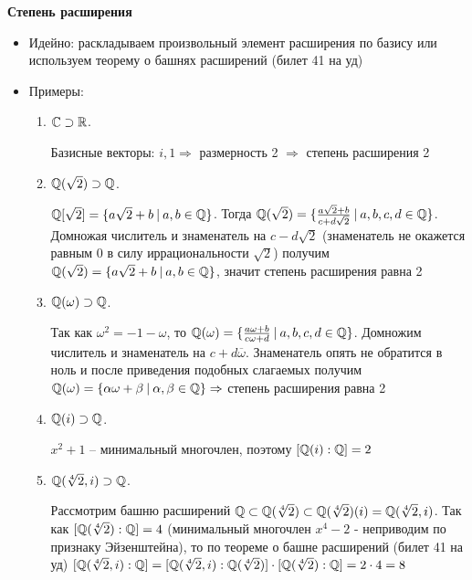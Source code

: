\par \textbf{Степень расширения}
\begin{itemize}
    \item Идейно: раскладываем произвольный элемент расширения по базису или используем теорему о башнях расширений (билет 41 на уд)
    \item Примеры:
\begin{enumerate}
    \item $\mathbb{C} \supset \mathbb{R}$. 
    \par Базисные векторы: $i, 1 \Rightarrow$ размерность 2 $\Rightarrow$ степень расширения 2
    \item $\mathbb{Q}(\sqrt{2}) \supset \mathbb{Q}$.
    \par $\mathbb{Q}[\sqrt{2}]=\{a\sqrt{2}+b \: | \: a, b \in \mathbb{Q}\}$. Тогда $\mathbb{Q}(\sqrt{2})=\{\frac{a\sqrt{2}+b}{c+d\sqrt{2}} \: | \: a,b,c,d \in \mathbb{Q}\}$. Домножая числитель и знаменатель на $c-d\sqrt{2}$ (знаменатель не окажется равным 0 в силу иррациональности $\sqrt{2}$) получим $\mathbb{Q}(\sqrt{2})=\{a\sqrt{2}+b \: | \: a,b \in \mathbb{Q}\}$, значит степень расширения равна 2
    \item $\mathbb{Q}(\omega) \supset \mathbb{Q}$.
    \par Так как $\omega^2=-1-\omega$, то $\mathbb{Q}(\omega)=\{\frac{a\omega+b}{c\omega+d} \: | \: a,b,c,d \in \mathbb{Q}\}$. Домножим числитель и знаменатель на $c+d\overline{\omega}$. Знаменатель опять не обратится в ноль и после приведения подобных слагаемых получим $\mathbb{Q}(\omega)=\{\alpha\omega+\beta \: | \: \alpha, \beta \in \mathbb{Q}\} \Rightarrow$ степень расширения равна 2
    \item $\mathbb{Q}(i) \supset \mathbb{Q}$.
    \par $x^2 + 1$ -- минимальный многочлен, поэтому $[\mathbb{Q}(i):\mathbb{Q}]=2$
    \item $\mathbb{Q}(\sqrt[4]{2}, i) \supset \mathbb{Q}$.
    \par Рассмотрим башню расширений $\mathbb{Q} \subset \mathbb{Q}(\sqrt[4]{2})\subset \mathbb{Q}(\sqrt[4]{2})(i)=\mathbb{Q}(\sqrt[4]{2}, i)$. \newline Так как $[\mathbb{Q}(\sqrt[4]{2}):\mathbb{Q}]=4$ (минимальный многочлен $x^4-2$ - неприводим по признаку Эйзенштейна), то по теореме о башне расширений (билет 41 на уд) \newline $[\mathbb{Q}(\sqrt[4]{2},i):\mathbb{Q}]= [\mathbb{Q}(\sqrt[4]{2},i):\mathbb{Q}(\sqrt[4]{2})] \cdot [\mathbb{Q}(\sqrt[4]{2}):\mathbb{Q}] = 2 \cdot 4 = 8$
\end{enumerate}
\end{itemize}


